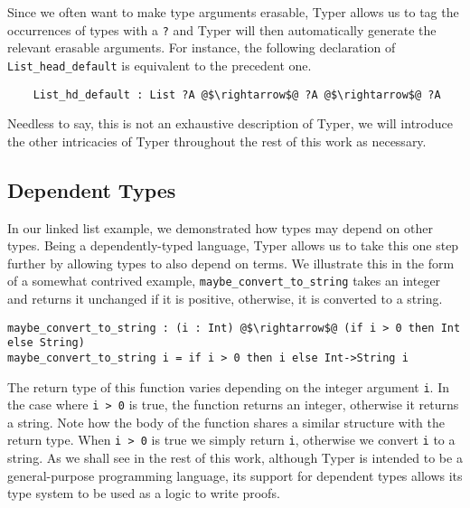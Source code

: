 \documentclass[12pt,twoside,maitrise]{dms}
\theoremstyle{definition}
\numberwithin{equation}{section}
\numberwithin{table}{chapter}
\numberwithin{figure}{chapter}
\newcommand\id[1] {\texttt{#1}}
\newcommand\fn[1] {\texttt{#1}}
\begin{document}
Since we often want to make type arguments erasable, Typer allows us to tag the
occurrences of types with a \id{?} and Typer will then automatically generate
the relevant erasable arguments. For instance, the following declaration of
\id{List_head_default} is equivalent to the precedent one.

\begin{verbatim}
    List_hd_default : List ?A @$\rightarrow$@ ?A @$\rightarrow$@ ?A
\end{verbatim}

Needless to say, this is not an exhaustive description of Typer, we will
introduce the other intricacies of Typer throughout the rest of this work as
necessary.

\subsection{Dependent Types}

In our linked list example, we demonstrated how types may depend on other
types. Being a dependently-typed language, Typer allows us to take this one
step further by allowing types to also depend on terms. We illustrate this in
the form of a somewhat contrived example, \id{maybe_convert_to_string} takes an
integer and returns it unchanged if it is positive, otherwise, it is converted
to a string.

\begin{verbatim}
maybe_convert_to_string : (i : Int) @$\rightarrow$@ (if i > 0 then Int else String)
maybe_convert_to_string i = if i > 0 then i else Int->String i
\end{verbatim}

The return type of this function varies depending on the integer argument \id{i}.
In the case where \fn{i > 0} is true, the function returns an integer,
otherwise it returns a string. Note how the body of the function shares a similar
structure with the return type. When \fn{i > 0} is true we simply return
\id{i}, otherwise we convert \id{i} to a string. As we shall see in the rest of
this work, although Typer is intended to be a general-purpose programming
language, its support for dependent types allows its type system to be used as
a logic to write proofs.
\end{document}
